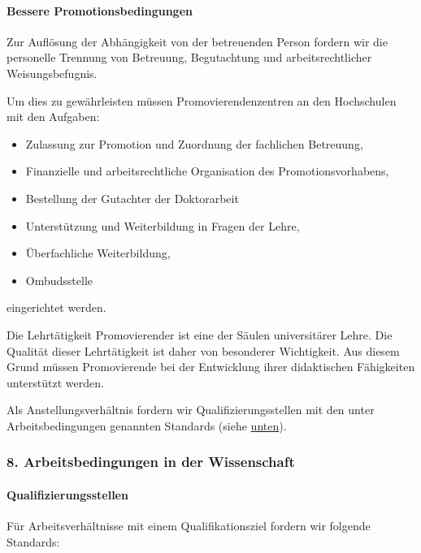 \documentclass[DIV=calc]{scrartcl}
\begin{document}
\hypertarget{bessere-promotionsbedingungen}{%
\paragraph{Bessere Promotionsbedingungen}\label{bessere-promotionsbedingungen}}

Zur Auflösung der Abhängigkeit von der betreuenden Person fordern wir die personelle Trennung von Betreuung, Begutachtung und arbeitsrechtlicher Weisungsbefugnis.

Um dies zu gewährleisten müssen Promovierendenzentren an den Hochschulen mit den Aufgaben:
\begin{itemize}
\item Zulassung zur Promotion und Zuordnung der fachlichen Betreuung,
\item Finanzielle und arbeitsrechtliche Organisation des Promotionsvorhabens,
\item Bestellung der Gutachter der Doktorarbeit
\item Unterstützung und Weiterbildung in Fragen der Lehre, 
\item Überfachliche Weiterbildung,
\item Ombudsstelle
\end{itemize}
eingerichtet werden.

Die Lehrtätigkeit Promovierender ist eine der Säulen universitärer Lehre. Die Qualität dieser Lehrtätigkeit ist daher von besonderer Wichtigkeit. Aus diesem Grund müssen Promovierende bei der Entwicklung ihrer didaktischen Fähigkeiten unterstützt werden.

Als Anstellungsverhältnis fordern wir Qualifizierungsstellen mit den unter Arbeitsbedingungen genannten Standards (siehe \href{https://protokolle.zapf.in/reso_BerlHG\#Qualifizierungsstellen}{unten}).


\hypertarget{arbeitsbedingungen-in-der-wissenschaft}{%
\subsubsection*{8. Arbeitsbedingungen in der Wissenschaft}\label{arbeitsbedingungen-in-der-wissenschaft}}

\hypertarget{qualifizierungsstellen}{%
\paragraph{Qualifizierungsstellen}\label{qualifizierungsstellen}}

Für Arbeitsverhältnisse mit einem Qualifikationsziel fordern wir folgende Standards:
\end{document}
